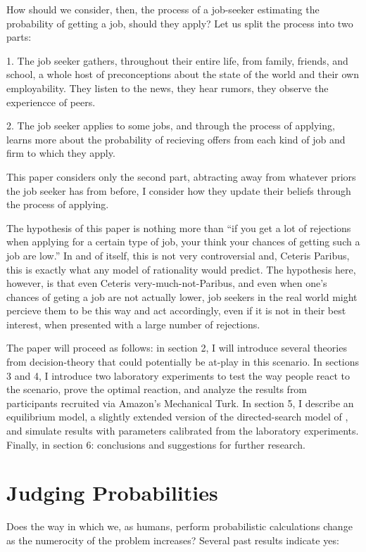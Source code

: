 \documentclass[a4paper,12pt]{article}
\begin{document}
How should we consider, then, the process of a job-seeker estimating the probability of getting a job, should they apply? Let us split the process into two parts:

1. The job seeker gathers, throughout their entire life, from family, friends, and school, a whole host of preconceptions about the state of the world and their own employability. They listen to the news, they hear rumors, they observe the experiencce of peers.

2. The job seeker applies to some jobs, and through the process of applying, learns more about the probability of recieving offers from each kind of job and firm to which they apply.

This paper considers only the second part, abtracting away from whatever priors the job seeker has from before, I consider how they update their beliefs through the process of applying.

The hypothesis of this paper is nothing more than ``if you get a lot of rejections when applying for a certain type of job, your think your chances of getting such a job are low.'' In and of itself, this is not very controversial and, Ceteris Paribus, this is exactly what any model of rationality would predict. The hypothesis here, however, is that even Ceteris very-much-not-Paribus, and even when one's chances of geting a job are not actually lower, job seekers in the real world might percieve them to be this way and act accordingly, even if it is not in their best interest, when presented with a large number of rejections.

The paper will proceed as follows: in section 2, I will introduce several theories from decision-theory that could potentially be at-play in this scenario. In sections 3 and 4, I introduce two laboratory experiments to test the way people react to the scenario, prove the optimal reaction, and analyze the results from participants recruited via Amazon's Mechanical Turk. In section 5, I describe an equilibrium model, a slightly extended version of the directed-search model of \cite{gonzalez2010}, and simulate results with parameters calibrated from the laboratory experiments. Finally, in section 6: conclusions and suggestions for further research.


\section { Judging Probabilities }

Does the way in which we, as humans, perform probabilistic calculations change as the numerocity of the problem increases? Several past results indicate yes:
\end{document}
